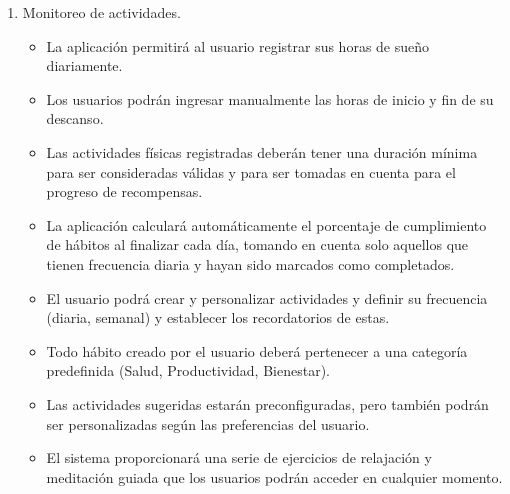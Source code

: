 \documentclass[letterpaper,12pt,oneside]{article}
\begin{document}
            \begin{enumerate}
                \item Monitoreo de actividades.
                \begin{itemize}
                    \item La aplicación permitirá al usuario registrar sus horas de sueño diariamente.
                    \item Los usuarios podrán ingresar manualmente las horas de inicio y fin de su descanso.
                    \item Las actividades físicas registradas deberán tener una duración mínima para ser consideradas válidas y para ser tomadas en cuenta para el progreso de recompensas.
                    \item La aplicación calculará automáticamente el porcentaje de cumplimiento de hábitos al finalizar cada día, tomando en cuenta solo aquellos que tienen frecuencia diaria y hayan sido marcados como completados.
                    \item El usuario podrá crear y personalizar actividades y definir su frecuencia (diaria, semanal) y establecer los recordatorios de estas.
                    \item Todo hábito creado por el usuario deberá pertenecer a una categoría predefinida (Salud, Productividad, Bienestar).
                    \item Las actividades sugeridas estarán preconfiguradas, pero también podrán ser personalizadas según las preferencias del usuario.
                    \item El sistema proporcionará una serie de ejercicios de relajación y meditación guiada que los usuarios podrán acceder en cualquier momento.
                \end{itemize}
            \end{enumerate}
\end{document}
